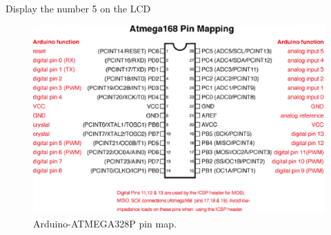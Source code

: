 \documentclass[journal,12pt,twocolumn]{IEEEtran}
\begin{document}
%
%


%
%
%
%
\begin{problem}
Display the number 5 on the LCD
\end{problem}
%
\begin{figure}
\centering
\includegraphics[width=\columnwidth]{./figs/Atmega168PinMap2.eps}
\caption{Arduino-ATMEGA328P pin map.}
\label{fig:arduino_atmega_pin_map}
\end{figure}
%
\end{document}
